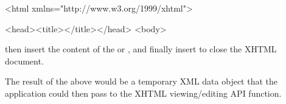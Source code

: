 \begin{description}
\begin{itemize}
    \begin{example}
\begin{blockChanged}<html xmlns="http://www.w3.org/1999/xhtml">\end{blockChanged}
    <head><title></title></head>
    <body>\end{example}
    then insert the content of the  or , and finally
    insert  to close the XHTML document.
  \end{itemize}

\end{description}
The result of the above would be a temporary XML data object that
the application could then pass to the XHTML viewing/editing API
function.

%


